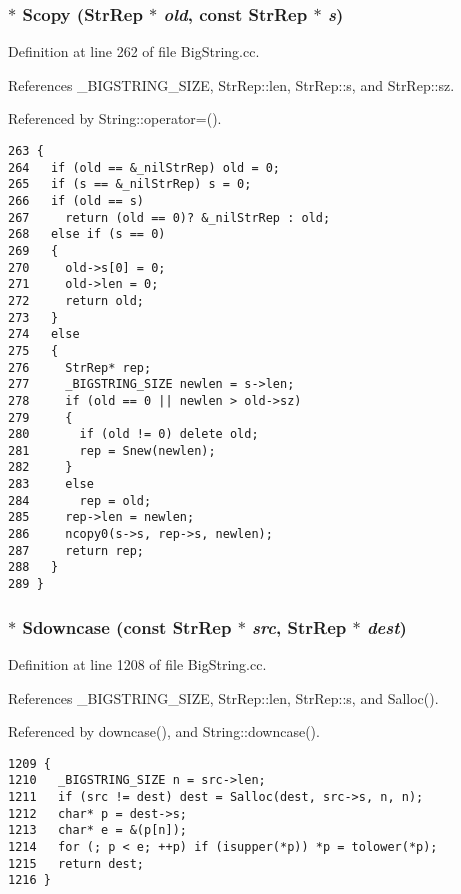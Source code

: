 \subsubsection{$\ast$ Scopy ({\bf Str\-Rep} $\ast$ {\em old}, const {\bf Str\-Rep} $\ast$ {\em s})}\label{BigString_8cc_a18}




Definition at line 262 of file Big\-String.cc.

References \_\-BIGSTRING\_\-SIZE, Str\-Rep::len, Str\-Rep::s, and Str\-Rep::sz.

Referenced by String::operator=().



\footnotesize\begin{verbatim}263 {
264   if (old == &_nilStrRep) old = 0;
265   if (s == &_nilStrRep) s = 0;
266   if (old == s) 
267     return (old == 0)? &_nilStrRep : old;
268   else if (s == 0)
269   {
270     old->s[0] = 0;
271     old->len = 0;
272     return old;
273   }
274   else 
275   {
276     StrRep* rep;
277     _BIGSTRING_SIZE newlen = s->len;
278     if (old == 0 || newlen > old->sz)
279     {
280       if (old != 0) delete old;
281       rep = Snew(newlen);
282     }
283     else
284       rep = old;
285     rep->len = newlen;
286     ncopy0(s->s, rep->s, newlen);
287     return rep;
288   }
289 }
\end{verbatim}\normalsize 
{}
\subsubsection{$\ast$ Sdowncase (const {\bf Str\-Rep} $\ast$ {\em src}, {\bf Str\-Rep} $\ast$ {\em dest})}\label{BigString_8cc_a36}




Definition at line 1208 of file Big\-String.cc.

References \_\-BIGSTRING\_\-SIZE, Str\-Rep::len, Str\-Rep::s, and Salloc().

Referenced by downcase(), and String::downcase().



\footnotesize\begin{verbatim}1209 {
1210   _BIGSTRING_SIZE n = src->len;
1211   if (src != dest) dest = Salloc(dest, src->s, n, n);
1212   char* p = dest->s;
1213   char* e = &(p[n]);
1214   for (; p < e; ++p) if (isupper(*p)) *p = tolower(*p);
1215   return dest;
1216 }
\end{verbatim}\normalsize 
{}
